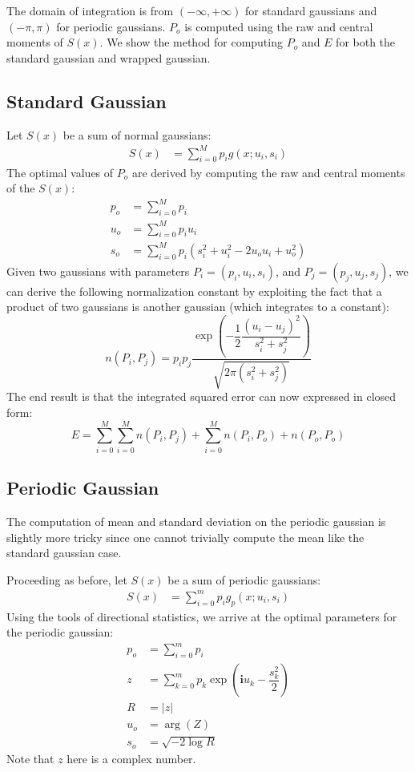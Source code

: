 \documentclass{acm_proc_article-sp}
\begin{document}
The domain of integration is from $(-\infty,+\infty)$ for standard gaussians and $(-\pi, \pi)$ for periodic gaussians. $P_o$ is computed using the raw and central moments of $S(x)$. We show the method for computing $P_o$ and $E$ for both the standard gaussian and wrapped gaussian. 

\subsection{Standard Gaussian}
Let $S(x)$ be a sum of normal gaussians:
\begin{align}
S(x) &= \sum\limits^{M}_{i=0} p_i g(x; u_i, s_i)
\end{align}
The optimal values of $P_o$ are derived by computing the raw and central moments of the $S(x)$:
\begin{align*}
p_o &= \sum \limits^{M}_{i=0} p_i \\
u_o &= \sum \limits^{M}_{i=0} p_i u_i \\
s_o &= \sum \limits^{M}_{i=0} p_i (s_i^2+u_i^2-2 u_o u_i + u_o^2)
\end{align*}
Given two gaussians with parameters $P_i = (p_i, u_i, s_i)$, and $P_j = (p_j, u_j, s_j)$, we can derive the following normalization constant by exploiting the fact that a product of two gaussians is another gaussian (which integrates to a constant):
\begin{equation}
n(P_i,P_j) = p_i p_j \dfrac{\exp\left(-\dfrac{1}{2} \dfrac{(u_i-u_j)^2}{s_i^2+s_j^2}\right)}{\sqrt{2\pi (s_i^2+s_j^2)}}
\end{equation}
The end result is that the integrated squared error can now expressed in closed form:
\begin{equation}
E = \sum \limits^{M}_{i=0} \sum \limits^{M}_{i=0} n(P_i, P_j) + \sum \limits^{M}_{i=0} n(P_i, P_o) +n(P_o, P_o)
\end{equation}

\subsection{Periodic Gaussian}

The computation of mean and standard deviation on the periodic gaussian is slightly more tricky since one cannot trivially compute the mean like the standard gaussian case. 

Proceeding as before, let $S(x)$ be a sum of periodic gaussians:
 \begin{align}
S(x) &= \sum\limits^{m}_{i=0} p_i g_p(x; u_i, s_i)
\end{align}
Using the tools of directional statistics, we arrive at the optimal parameters for the periodic gaussian:
\begin{align*}
p_o &= \sum \limits^{m}_{i=0} p_i \\
z &= \sum\limits^{m}_{k=0} p_k \exp\left(\boldsymbol{i}u_k-\dfrac{s_k^2}{2}\right) \\
R &= |z| \\
u_o &= \arg(Z) \\
s_o &= \sqrt{-2\log R}
\end{align*}
Note that $z$ here is a complex number.
\end{document}
